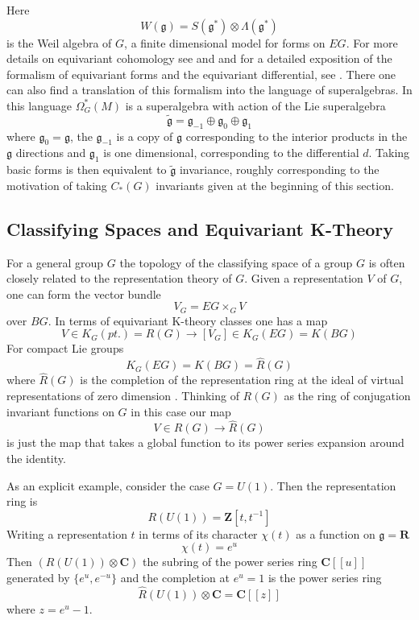 \documentclass[a4paper,a4paper]{article}
\theoremstyle{conjecture}
\begin{document}
Here 
$$W({\mathfrak {g}})=S({\mathfrak g}^*)\otimes\Lambda({\mathfrak g}^*)$$ 
is the Weil algebra of $G$, a finite dimensional model for forms on $EG$.
For more details on equivariant cohomology see \cite{Atiyah-Bott} and \cite{Ginzburg}
and for
a detailed exposition of the formalism of equivariant forms and the
equivariant differential, see \cite{GS}.  There one can also find
a translation of this formalism into the language of superalgebras.  In
this language $\Omega_G^*(M)$ is a superalgebra with action of the
Lie superalgebra
$$\tilde{\mathfrak g} ={\mathfrak g}_{-1} \oplus {\mathfrak g}_0 \oplus {\mathfrak g}_1$$
where ${\mathfrak g}_0=\mathfrak g$, the ${\mathfrak g}_{-1}$ is a copy of $\mathfrak g$
corresponding to the interior products in the $\mathfrak g$ directions and ${\mathfrak g}_1$
is one dimensional, corresponding to the differential $d$.  Taking basic forms
is then equivalent to $\tilde{\mathfrak g}$ invariance, roughly corresponding to the
motivation of taking $C_*(G)$ invariants given at the beginning of this section.



\subsection{Classifying Spaces and Equivariant K-Theory}

For a general group $G$ the topology of the classifying space of a
group $G$ is often closely related to the representation theory of
$G$. Given a representation $V$ of $G$, one can form the vector
bundle $$V_G=EG \times _G V$$over $BG$. In terms of equivariant
K-theory classes one has a map 
$$V\in K_G(pt.)=R(G)\rightarrow [V_G]\in K_G(EG)=K(BG)$$ 
For compact Lie groups
$$K_G(EG)=K(BG)=\widehat {R}(G)$$ where $\widehat {R}(G)$ is the
completion of the representation ring at the ideal of virtual
representations of zero dimension \cite{AH}.  Thinking of $R(G)$ as the ring
of conjugation invariant functions on $G$ in this case our map
$$V\in R(G)\rightarrow \widehat{R}(G)$$ is just the map that takes a global
function to its power series expansion around the identity.

As an explicit example, consider the case $G=U(1)$. Then the representation ring is
$$R(U(1))=\mathbf Z [t, t^{-1}]$$
Writing a representation $t$ in terms of its character $\chi(t)$ as a function on 
${\mathfrak g}=\mathbf R$
$$\chi(t)=e^u$$
Then 
$(R(U(1))\otimes \mathbf C)$ the subring of the power series ring ${\mathbf C}[[u]]$
generated by $\{e^u,e^{-u}\}$ and the completion at $e^u=1$ is the power series ring
$$\widehat{R}(U(1))\otimes \mathbf C={\mathbf C}[[z]]$$
where $z=e^u-1$.
\end{document}
